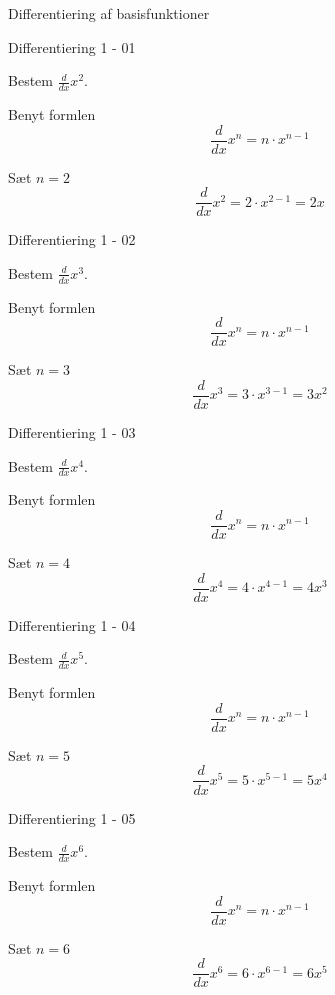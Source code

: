 \documentclass{article}
\begin{document}
Differentiering af basisfunktioner
\tableofcontents
\newpage

\begin{exercise}{Differentiering 1 - 01}

Bestem $\frac{d}{dx} x^2$.


\hint

Benyt formlen
\[
\frac{d}{dx} x^n = n \cdot x^{n - 1}
\]

\hint

Sæt $n = 2$
\[
\frac{d}{dx} x^2 = 2 \cdot x^{2 - 1} = 2 x
\]
\end{exercise}

\begin{exercise}{Differentiering 1 - 02}

Bestem $\frac{d}{dx} x^3$.


\hint

Benyt formlen
\[
\frac{d}{dx} x^n = n \cdot x^{n - 1}
\]

\hint

Sæt $n = 3$
\[
\frac{d}{dx} x^3 = 3 \cdot x^{3 - 1} = 3 x^2
\]
\end{exercise}

\begin{exercise}{Differentiering 1 - 03}

Bestem $\frac{d}{dx} x^4$.


\hint

Benyt formlen
\[
\frac{d}{dx} x^n = n \cdot x^{n - 1}
\]

\hint

Sæt $n = 4$
\[
\frac{d}{dx} x^4 = 4 \cdot x^{4 - 1} = 4 x^3
\]
\end{exercise}

\begin{exercise}{Differentiering 1 - 04}

Bestem $\frac{d}{dx} x^5$.


\hint

Benyt formlen
\[
\frac{d}{dx} x^n = n \cdot x^{n - 1}
\]

\hint

Sæt $n = 5$
\[
\frac{d}{dx} x^5 = 5 \cdot x^{5 - 1} = 5 x^4
\]
\end{exercise}

\begin{exercise}{Differentiering 1 - 05}

Bestem $\frac{d}{dx} x^6$.


\hint

Benyt formlen
\[
\frac{d}{dx} x^n = n \cdot x^{n - 1}
\]

\hint

Sæt $n = 6$
\[
\frac{d}{dx} x^6 = 6 \cdot x^{6 - 1} = 6 x^5
\]
\end{exercise}
\end{document}
